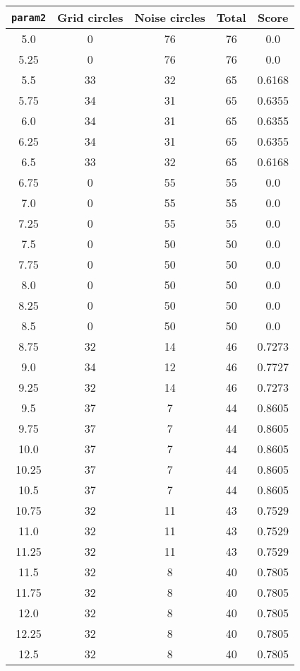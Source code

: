 \documentclass[letterpaper, 12pt]{article}
\begin{document}
\begin{longtable}{|c|c|c|c|c|}
\hline
\textbf{\texttt{param2}} & \textbf{Grid circles} & \textbf{Noise circles} & \textbf{Total} & \textbf{Score} \\
\hline
5.0 & 0 & 76 & 76 & 0.0 \\
\hline
5.25 & 0 & 76 & 76 & 0.0 \\
\hline
5.5 & 33 & 32 & 65 & 0.6168 \\
\hline
5.75 & 34 & 31 & 65 & 0.6355 \\
\hline
6.0 & 34 & 31 & 65 & 0.6355 \\
\hline
6.25 & 34 & 31 & 65 & 0.6355 \\
\hline
6.5 & 33 & 32 & 65 & 0.6168 \\
\hline
6.75 & 0 & 55 & 55 & 0.0 \\
\hline
7.0 & 0 & 55 & 55 & 0.0 \\
\hline
7.25 & 0 & 55 & 55 & 0.0 \\
\hline
7.5 & 0 & 50 & 50 & 0.0 \\
\hline
7.75 & 0 & 50 & 50 & 0.0 \\
\hline
8.0 & 0 & 50 & 50 & 0.0 \\
\hline
8.25 & 0 & 50 & 50 & 0.0 \\
\hline
8.5 & 0 & 50 & 50 & 0.0 \\
\hline
8.75 & 32 & 14 & 46 & 0.7273 \\
\hline
9.0 & 34 & 12 & 46 & 0.7727 \\
\hline
9.25 & 32 & 14 & 46 & 0.7273 \\
\hline
9.5 & 37 & 7 & 44 & 0.8605 \\
\hline
9.75 & 37 & 7 & 44 & 0.8605 \\
\hline
10.0 & 37 & 7 & 44 & 0.8605 \\
\hline
10.25 & 37 & 7 & 44 & 0.8605 \\
\hline
10.5 & 37 & 7 & 44 & 0.8605 \\
\hline
10.75 & 32 & 11 & 43 & 0.7529 \\
\hline
11.0 & 32 & 11 & 43 & 0.7529 \\
\hline
11.25 & 32 & 11 & 43 & 0.7529 \\
\hline
11.5 & 32 & 8 & 40 & 0.7805 \\
\hline
11.75 & 32 & 8 & 40 & 0.7805 \\
\hline
12.0 & 32 & 8 & 40 & 0.7805 \\
\hline
12.25 & 32 & 8 & 40 & 0.7805 \\
\hline
12.5 & 32 & 8 & 40 & 0.7805 \\

\end{longtable}
\end{document}
